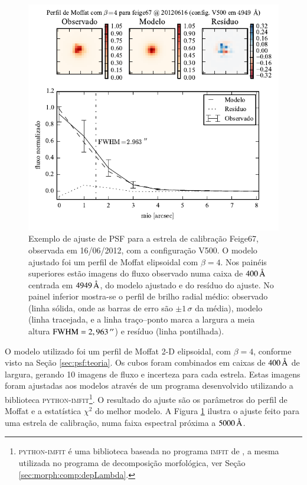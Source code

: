 \begin{figure}
	\includegraphics{figuras/PSFMoffatBeta4_exemplo}
	\caption[Exemplo de ajuste de PSF para estrela de calibração]
	{Exemplo de ajuste de PSF para a estrela de calibração Feige67, observada em
	16/06/2012, com a configuração V500. O modelo ajustado foi um perfil de
	Moffat elipsoidal com $\beta=4$. Nos painéis superiores estão imagens do fluxo
	observado numa caixa de $400\,\text{\normalfont\AA}$ centrada em $4949\,\text{\normalfont\AA}$,
	do modelo ajustado e do resíduo do ajuste. No painel inferior mostra-se o
	perfil de brilho radial médio: observado (linha sólida, onde as barras de erro
	são $\pm 1\,\sigma$ da média), modelo (linha tracejada, e a linha traço--ponto
	marca a largura a meia altura $\mathrm{FWHM}=2,963\,^{\prime\prime}$) e resíduo (linha
	pontilhada).}
	\label{fig:PSFExemplo}
\end{figure}

O modelo utilizado foi um perfil de Moffat 2-D elipsoidal, com $\beta\!=\!4$,
conforme visto na Seção \ref{sec:psf:teoria}. Os cubos foram combinados em
caixas de $400\,\text{\normalfont\AA}$ de largura, gerando 10 imagens de fluxo e incerteza
para cada estrela. Estas imagens foram ajustadas aos modelos através de um
programa desenvolvido utilizando a biblioteca
\textsc{python-imfit}\footnote{\textsc{python-imfit} é uma biblioteca baseada no
programa \textsc{imfit} de \citet{Erwin2015}, a mesma utilizada no programa de
decomposição morfológica, ver Seção \ref{sec:morph:comp:depLambda}.}. O
resultado do ajuste são os parâmetros do perfil de Moffat e a estatística
$\chi^2$ do melhor modelo.
A Figura \ref{fig:PSFExemplo} ilustra o ajuste feito para uma estrela de
calibração, numa faixa espectral próxima a $5000\,\text{\normalfont\AA}$.

